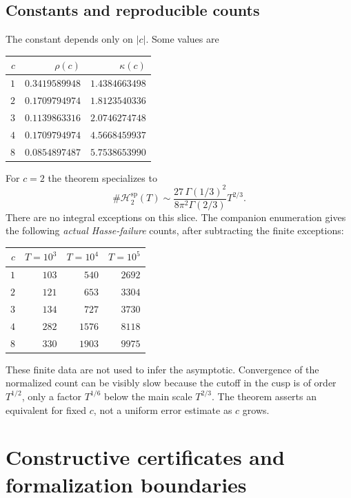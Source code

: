 \documentclass[11pt]{article}
\numberwithin{equation}{section}
\theoremstyle{plain}
\theoremstyle{plain}
\theoremstyle{plain}
\theoremstyle{definition}
\theoremstyle{definition}
\theoremstyle{definition}
\theoremstyle{remark}
\newcommand{\Hsplit}{\mathcal H^{\mathrm{sp}}}
\begin{document}
\subsection{Constants and reproducible counts}
The constant depends only on $|c|$. Some values are
\begin{center}
\begin{tabular}{r r r}
\toprule
$c$ & $\rho(c)$ & $\kappa(c)$\\
\midrule
$1$ & $0.3419589948$ & $1.4384663498$\\
$2$ & $0.1709794974$ & $1.8123540336$\\
$3$ & $0.1139863316$ & $2.0746274748$\\
$4$ & $0.1709794974$ & $4.5668459937$\\
$8$ & $0.0854897487$ & $5.7538653990$\\
\bottomrule
\end{tabular}
\end{center}
For $c=2$ the theorem specializes to
\begin{equation}\label{alg:dh:eq:c2constant}
 \#\Hsplit_2(T)\sim
 \frac{27\,\Gamma(1/3)^2}{8\pi^2\Gamma(2/3)}T^{2/3}.
\end{equation}
There are no integral exceptions on this slice.
The companion enumeration gives the following \emph{actual Hasse-failure}
counts, after subtracting the finite exceptions:
\begin{center}
\begin{tabular}{r r r r}
\toprule
$c$ & $T=10^3$ & $T=10^4$ & $T=10^5$\\
\midrule
$1$ & $103$ & $540$ & $2692$\\
$2$ & $121$ & $653$ & $3304$\\
$3$ & $134$ & $727$ & $3730$\\
$4$ & $282$ & $1576$ & $8118$\\
$8$ & $330$ & $1903$ & $9975$\\
\bottomrule
\end{tabular}
\end{center}
These finite data are not used to infer the asymptotic. Convergence of the
normalized count can be visibly slow because the cutoff in the cusp is
of order $T^{1/2}$, only a factor $T^{1/6}$ below the main scale
$T^{2/3}$. The theorem asserts an equivalent for fixed $c$, not a uniform
error estimate as $c$ grows.

\section{Constructive certificates and formalization boundaries}\label{alg:dh:sec:certificates}
\end{document}
